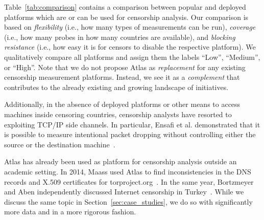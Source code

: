 Table~\ref{tab:comparison} contains a comparison between popular and deployed
platforms which are or can be used for censorship analysis.  Our comparison is
based on \emph{flexibility} (i.e., how many types of measurements can be run),
\emph{coverage} (i.e., how many probes in how many countries are available),
and \emph{blocking resistance} (i.e., how easy it is for censors to disable the
respective platform).  We qualitatively compare all platforms and assign them
the labels ``Low'', ``Medium'', or ``High''.  Note that we do not propose
Atlas as \emph{replacement} for any existing censorship measurement platforms.
Instead, we see it as a \emph{complement} that contributes to the already
existing and growing landscape of initiatives.

Additionally, in the absence of deployed platforms or other means to access
machines inside censoring countries, censorship analysts have resorted to
exploiting TCP/IP side channels.  In particular, Ensafi et al. demonstrated
that it is possible to measure intentional packet dropping without controlling
either the source or the destination machine~\cite{Ensafi2014}.

Atlas has already been used as platform for censorship analysis outside an
academic setting.  In 2014, Maass used Atlas to find inconsistencies in the DNS
records and X.509 certificates for torproject.org~\cite{Maass2014}.  In the
same year, Bortzmeyer and Aben independently discussed Internet censorship in
Turkey~\cite{Bortzmeyer14,Aben14}.  While we discuss the same topic in
Section~\ref{sec:case_studies}, we do so with significantly more data and in a
more rigorous fashion.
